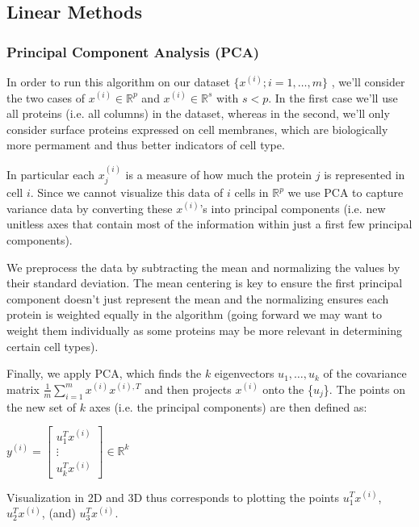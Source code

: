 \documentclass{article} %
\begin{document}
\subsection{Linear Methods}

\subsubsection{Principal Component Analysis (PCA)}
In order to run this algorithm on our dataset {$ \{x^{(i)}; i=1,\ldots,m\} $} , we'll consider the two cases of $x^{(i)} \in \mathbb{R}^p$ and $x^{(i)} \in \mathbb{R}^s$ with $s<p$. In the first case we'll use all proteins (i.e. all columns) in the dataset, whereas in the second, we'll only consider surface proteins expressed on cell membranes, which are biologically more permament and thus better indicators of cell type. 

In particular each {$x_j^{(i)}$} is a measure of how much the protein {$ j $} is represented in cell {$i$}. Since we cannot visualize this data of {$ i $} cells in {$ \mathbb{R}^p $} we use PCA to capture variance data by converting these {$x^{(i)}$}'s into principal components (i.e. new unitless axes that contain most of the information within just a first few principal components).

We preprocess the data by subtracting the mean and normalizing the values by their standard deviation. The mean centering is key to ensure the first principal component doesn't just represent the mean and the normalizing ensures each protein is weighted equally in the algorithm (going forward we may want to weight them individually as some proteins may be more relevant in determining certain cell types). 

Finally, we apply PCA, which finds the {$ k $} eigenvectors {$ u_1,\ldots,u_k $} of the covariance matrix {$\frac{1}{m}\sum_{i=1}^m x^{(i)}x^{(i),T}$} and then projects $x^{(i)}$ onto the \{$u_j$\}. The points on the new set of $k$ axes (i.e. the principal components) are then defined as:

\begin{center}
{$ y^{(i)} = \left[ {\begin{array}{cc}
   u_1^Tx^{(i)}  \\
   \vdots  \\
   u_k^Tx^{(i)}
  \end{array} } \right] \in \mathbb{R}^{k} $}
\end{center}

Visualization in 2D and 3D thus corresponds to plotting the points $u_1^Tx^{(i)}$, $u_2^Tx^{(i)}$, (and) $u_3^Tx^{(i)}$.
\end{document}
